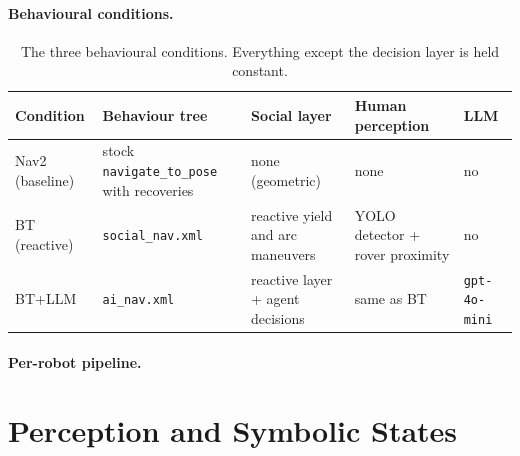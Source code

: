 \paragraph{Behavioural conditions.}


\begin{table}[htbp]
  \centering
  \small
  \caption{The three behavioural conditions. Everything except the decision layer
  is held constant.}
  \label{tab:conditions}
  \begin{tabular}{p{2.4cm}p{2.6cm}p{2.6cm}p{2.6cm}p{2.0cm}}
    \toprule
    Condition & Behaviour tree & Social layer & Human perception & LLM \\
    \midrule
    Nav2 (baseline) & stock \texttt{navigate\_to\_pose} with recoveries &
    none (geometric) & none & no \\
    BT (reactive) & \texttt{social\_nav.xml} & reactive yield and arc maneuvers &
    YOLO detector + rover proximity & no \\
    BT+LLM & \texttt{ai\_nav.xml} & reactive layer + agent decisions &
    same as BT & \texttt{gpt-4o-mini} \\
    \bottomrule
  \end{tabular}
\end{table}


\paragraph{Per-robot pipeline.}


\section{Perception and Symbolic States}
\label{sec:sd_perception}

